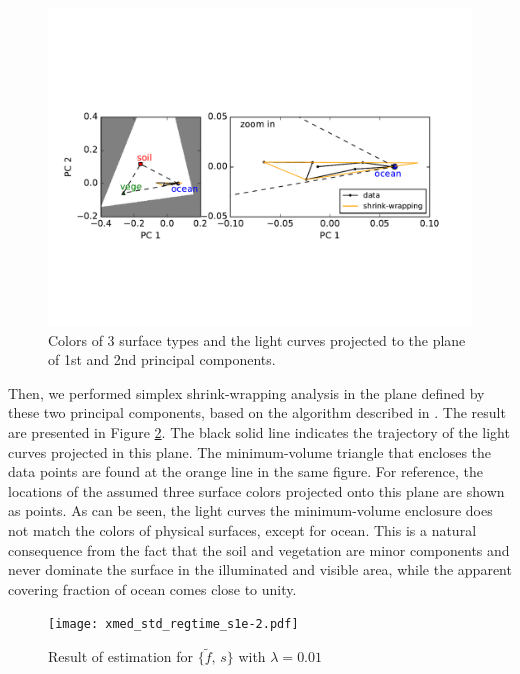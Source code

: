 \documentclass[iop,numberedappendix,apj,]{emulateapj}
\def\fast{\tilde f}
\begin{document}
\begin{figure}[b]
    \begin{center}
\includegraphics[width=\hsize]{mockdata_quadrature_PCplane.pdf}
    \end{center}
    \caption{Colors of 3 surface types and the light curves projected to the plane of 1st and 2nd principal components. }
\label{fig:shrinkwrap}
\end{figure}

Then, we performed simplex shrink-wrapping analysis in the plane defined by these two principal components, based on the algorithm described in \citet{Fuhrmann1999}. 
The result are presented in Figure \ref{fig:shrinkwrap}. 
The black solid line indicates the trajectory of the light curves projected in this plane. 
The minimum-volume triangle that encloses the data points are found at the orange line in the same figure. 
For reference, the locations of the assumed three surface colors projected onto this plane are shown as points. 
As can be seen, the light curves the minimum-volume enclosure does not match the colors of physical surfaces, except for ocean. 
This is a natural consequence from the fact that the soil and vegetation are minor components and never dominate the surface in the illuminated and visible area, while the apparent covering fraction of ocean comes close to unity. 



\clearpage

\begin{figure}[!htbp]
    \begin{center}
\texttt{[image: xmed\_std\_regtime\_s1e-2.pdf]}
    \end{center}
    \caption{Result of estimation for $\{ \fast,\,s\}$ with $\lambda = 0.01$}
\label{fig:shrinkwrap}
\end{figure}
\end{document}
